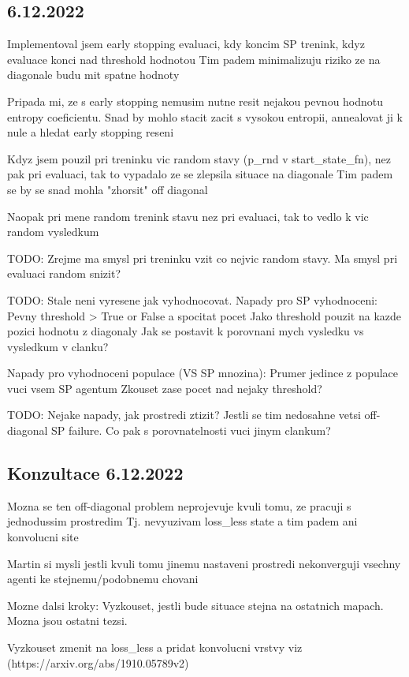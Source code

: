 \documentclass{report}
\begin{document}
\subsection*{6.12.2022}
\begin{list}{}{}
    \item Implementoval jsem early stopping evaluaci, kdy koncim SP trenink, kdyz evaluace konci nad threshold hodnotou
        Tim padem minimalizuju riziko ze na diagonale budu mit spatne hodnoty
    \item Pripada mi, ze s early stopping nemusim nutne resit nejakou pevnou hodnotu entropy coeficientu.
        Snad by mohlo stacit zacit s vysokou entropii, annealovat ji k nule a hledat early stopping reseni
    \item Kdyz jsem pouzil pri treninku vic random stavy (p\_rnd v start\_state\_fn), nez pak pri evaluaci, tak to vypadalo ze se zlepsila situace na diagonale
        Tim padem se by se snad mohla "zhorsit" off diagonal
    \item Naopak pri mene random trenink stavu nez pri evaluaci, tak to vedlo k vic random vysledkum
    \item TODO: Zrejme ma smysl pri treninku vzit co nejvic random stavy. Ma smysl pri evaluaci random snizit?
    \item TODO: Stale neni vyresene jak vyhodnocovat. 
        Napady pro SP vyhodnoceni: 
            Pevny threshold > True or False a spocitat pocet
            Jako threshold pouzit na kazde pozici hodnotu z diagonaly  
            Jak se postavit k porovnani mych vysledku vs vysledkum v clanku?

        Napady pro vyhodnoceni populace (VS SP mnozina):
            Prumer jedince z populace vuci vsem SP agentum
            Zkouset zase pocet nad nejaky threshold?

    \item TODO: Nejake napady, jak prostredi ztizit? Jestli se tim nedosahne vetsi off-diagonal SP failure.
        Co pak s porovnatelnosti vuci jinym clankum?

\end{list}

\subsection*{Konzultace 6.12.2022}
\begin{list}{}{}
    \item Mozna se ten off-diagonal problem neprojevuje kvuli tomu, ze pracuji s jednodussim prostredim
        Tj. nevyuzivam loss\_less state a tim padem ani konvolucni site
    \item Martin si mysli jestli kvuli tomu jinemu nastaveni prostredi nekonverguji vsechny agenti ke stejnemu/podobnemu chovani
    \item Mozne dalsi kroky: Vyzkouset, jestli bude situace stejna na ostatnich mapach. Mozna jsou ostatni tezsi.
    \item Vyzkouset zmenit na loss\_less a pridat konvolucni vrstvy viz (https://arxiv.org/abs/1910.05789v2)

\end{list}
\end{document}
